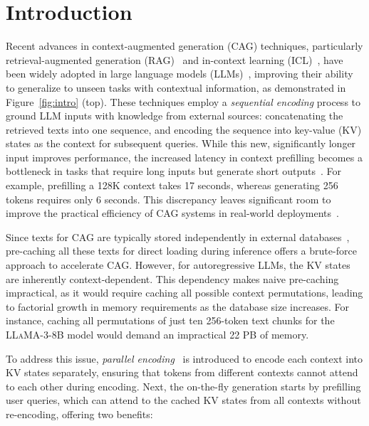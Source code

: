 \section{Introduction}
Recent advances in context-augmented generation (CAG) techniques, particularly retrieval-augmented generation (RAG)~\citep{gupta2024rag, gao2023retrieval} and in-context learning (ICL)~\citep{dong2022survey, wei2022emergent}, have been widely adopted in large language models (LLMs)~\citep{llama3, achiam2023gpt}, improving their ability to generalize to unseen tasks with contextual information, as demonstrated in Figure~\ref{fig:intro} (top).
These techniques employ a \textit{sequential encoding} process to ground LLM inputs with knowledge from external sources: concatenating the retrieved texts into one sequence, and encoding the sequence into key-value (KV) states as the context for subsequent queries. While this new, significantly longer input improves performance, the increased latency in context prefilling becomes a bottleneck in tasks that require long inputs but generate short outputs~\citep{bai2023longbench, agarwal2024many, jiang2024longrag}. For example, prefilling a 128K context takes 17 seconds, whereas generating 256 tokens requires only 6 seconds. This discrepancy leaves significant room to improve the practical efficiency of CAG systems in real-world deployments~\citep{Liu_LlamaIndex_2022, Chase_Longchain_2022}.

Since texts for CAG are typically stored independently in external databases~\citep{Qdrant, douze2024faiss}, pre-caching all these texts for direct loading during inference offers a brute-force approach to accelerate CAG. However, for autoregressive LLMs, the KV states are inherently context-dependent. This dependency makes naive pre-caching impractical, as it would require caching all possible context permutations, leading to factorial growth in memory requirements as the database size increases. For instance, caching all permutations of just ten 256-token text chunks for the \textsc{LLaMA-3-8B} model would demand an impractical 22 PB of memory.

To address this issue, \textit{parallel encoding}~\citep{ratner2022parallel, yen2024long, li2024focusllm, Sun2024BlockAttentionFE} is introduced to encode each context into KV states separately, ensuring that tokens from different contexts cannot attend to each other during encoding. Next, the on-the-fly generation starts by prefilling user queries, which can attend to the cached KV states from all contexts without re-encoding, offering two benefits:


